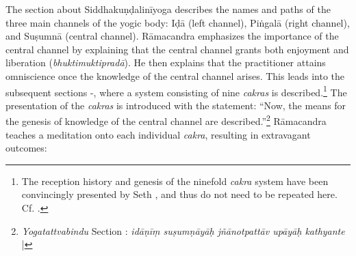 The section about Siddhakuṇḍalinīyoga describes the names and paths of the three main channels of the yogic body: Iḍā (left channel), Piṅgalā (right channel), and Suṣumnā (central channel). Rāmacandra emphasizes the importance of the central channel by explaining that the central channel grants both enjoyment and liberation (\textit{bhuktimuktipradā}). He then explains that the practitioner attains omniscience once the knowledge of the central channel arises. This leads into the subsequent sections -, where a system consisting of nine \textit{cakras} is described.\footnote{The reception history and genesis of the ninefold \textit{cakra} system have been convincingly presented by Seth \citeauthor{powell2023}, and thus do not need to be repeated here. Cf. \citeauthor[2023: 215-218]{powell2023}.} The presentation of the \textit{cakras} is introduced with the statement: ``Now, the means for the genesis of knowledge of the central channel are described.''\footnote{\emph{Yogatattvabindu} Section : \textit{idāṇīṃ suṣumṇāyāḥ jñānotpattāv upāyāḥ kathyante} |} Rāmacandra teaches a meditation onto each individual \textit{cakra}, resulting in extravagant outcomes:

